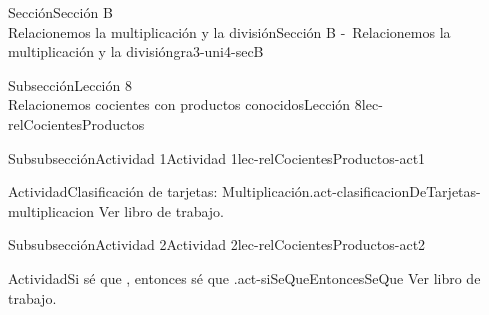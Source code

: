 \begin{sectionptx}{Sección}{{\Large Sección B\\}Relacionemos la multiplicación y la división}{}{Sección B -~Relacionemos la multiplicación y la división}{}{}{gra3-uni4-secB}
\begin{subsectionptx}{Subsección}{{\normalsize Lección 8\\[-0.05cm]}Relacionemos cocientes con productos conocidos}{}{Lección 8}{}{}{lec-relCocientesProductos}
%
\begin{subsubsectionptx}{Subsubsección}{Actividad 1}{}{Actividad 1}{}{}{lec-relCocientesProductos-act1}
\begin{activity}{Actividad}{Clasificación de tarjetas: Multiplicación.}{act-clasificacionDeTarjetas-multiplicacion}%
Ver libro de trabajo.
\end{activity}%
\end{subsubsectionptx}
%
%
\typeout{************************************************}
\typeout{************************************************}
%
\begin{subsubsectionptx}{Subsubsección}{Actividad 2}{}{Actividad 2}{}{}{lec-relCocientesProductos-act2}
\begin{activity}{Actividad}{Si sé que \textellipsis{}, entonces sé que \textellipsis{}.}{act-siSeQueEntoncesSeQue}%
Ver libro de trabajo.
\end{activity}%
\end{subsubsectionptx}
\end{subsectionptx}
%
%
\typeout{************************************************}
\typeout{************************************************}

\end{sectionptx}

